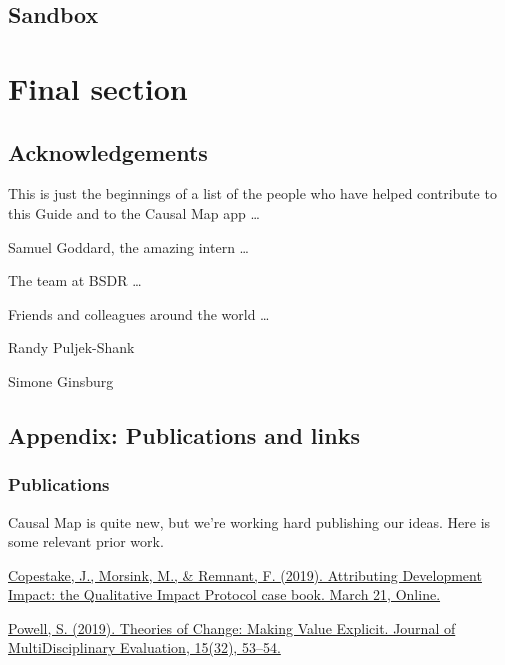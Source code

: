 \documentclass[
]{book}
\begin{document}
\hypertarget{sandbox}{%
\chapter{Sandbox}\label{sandbox}}

\hypertarget{part-final-section}{%
\part{Final section}\label{part-final-section}}

\hypertarget{acknowledgements}{%
\chapter{Acknowledgements}\label{acknowledgements}}

This is just the beginnings of a list of the people who have helped contribute to this Guide and to the Causal Map app \ldots{}

Samuel Goddard, the amazing intern \ldots{}

The team at BSDR \ldots{}

Friends and colleagues around the world \ldots{}

Randy Puljek-Shank

Simone Ginsburg

\hypertarget{appendix-publications-and-links}{%
\chapter{Appendix: Publications and links}\label{appendix-publications-and-links}}

\hypertarget{publications}{%
\section{Publications}\label{publications}}

Causal Map is quite new, but we're working hard publishing our ideas. Here is some relevant prior work.

\href{https://practicalactionpublishing.com/book/105/attributing-development-impact}{Copestake, J., Morsink, M., \& Remnant, F. (2019). Attributing Development Impact: the Qualitative Impact Protocol case book. March 21, Online.}

\href{https://journals.sfu.ca/jmde/index.php/jmde_1/article/view/563}{Powell, S. (2019). Theories of Change: Making Value Explicit. Journal of MultiDisciplinary Evaluation, 15(32), 53--54.}
\end{document}

